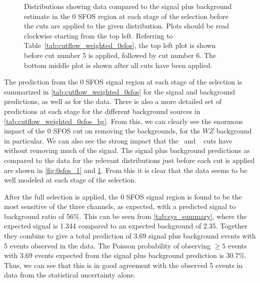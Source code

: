 \begin{figure}[ht!]
\caption{Distributions showing data compared to the signal plus background estimate in the 0 SFOS region at each stage 
of the selection before the cuts are applied to the given distribution. 
Plots should be read clockwise starting from the top left.
Referring to Table~\ref{tab:cutflow_weighted_0sfos}, the top left
plot is shown before cut number 5 is applied, followed by cut
number 6. The bottom middle plot is shown after all cuts have been applied.
}
\label{fig:0sfos_2}
\end{figure}


The prediction from the 0 SFOS signal region at each stage of the selection
is summarized in 
\tab\ref{tab:cutflow_weighted_0sfos}
for the signal and background predictions, as well as for the data.
There is also a more detailed set of predictions at each stage for the 
different background sources in 
\tab\ref{tab:cutflow_weighted_0sfos_bg}. 
From this, we can clearly see the enormous impact of the 0 SFOS
cut on removing the backgrounds, for the $WZ$ background in particular.
We can also see the strong impact that the \nbjet~and \deltaphi~
cuts have without removing much of the signal.
The signal plus background predictions as 
compared to the data
for the relevant distributions just before each cut is applied are shown in 
\fig\ref{fig:0sfos_1} and \fig\ref{fig:0sfos_2}. From this it is clear
that the data seems to be well modeled at each stage of the selection.

After the full selection is applied,
the 0 SFOS signal region is found to be the most sensitive of the three
channels, as expected, with a predicted signal to background ratio of 56\%.
This can be seen from \tab\ref{tab:sys_summary}, where the expected signal
is 1.344 compared to an expected background of 2.35. Together they 
combine to give a total prediction of 3.69 signal plus background events 
with 5 events observed in the data.
The Poisson probability of observing $\geq 5$ events with 3.69 events expected 
from the signal plus background prediction is 30.7\%. 
Thus, we can see that this is in good agreement with the observed 5 events in data
from the statistical uncertainty alone. 

